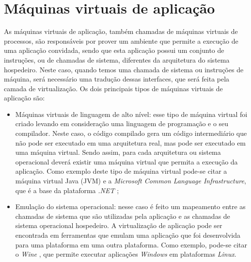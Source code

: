 \section{Máquinas virtuais de aplicação}
\label{section:virtaplicacao}

As máquinas virtuais de aplicação, também chamadas de máquinas virtuais de processos, são responsáveis por prover um ambiente que permite 
a execução de uma aplicação convidada, sendo que esta aplicação possui um conjunto de instruções, ou de chamadas de sistema, diferentes da 
arquitetura do sistema hospedeiro. Neste caso, quando temos uma chamada de sistema ou instruções de máquina, será necessário uma 
tradução dessas interfaces, que será feita pela camada de virtualização. Os dois principais tipos de máquinas virtuais de aplicação são:

\begin{itemize}
 \item Máquinas virtuais de linguagem de alto nível: esse tipo de máquina virtual foi criado levando em consideração uma linguagem de 
 programação e o seu compilador. Neste caso, o código compilado gera um código intermediário que não pode ser executado em uma arquitetura real, 
 mas pode ser executado em uma máquina virtual. Sendo assim, para cada arquitetura ou sistema operacional deverá existir uma máquina virtual que
 permita a execução da aplicação. Como exemplo deste tipo de máquina virtual pode-se citar a máquina virtual Java (\ac{JVM})
 e a \textit{Microsoft Common Language Infrastructure}, que é a base da plataforma \textit{.NET} \cite{carissimi2008};
 \item Emulação do sistema operacional: nesse caso é feito um mapeamento entre as chamadas de sistema que são utilizadas pela aplicação 
 e as chamadas de sistema operacional hospedeiro. A virtualização de aplicação pode ser encontrada em ferramentas que emulam uma aplicação que foi
 desenvolvida para uma plataforma em uma outra plataforma. Como exemplo, pode-se citar o \textit{Wine} \cite{wine}, que permite executar 
 aplicações \textit{Windows} em plataformas \textit{Linux}.
\end{itemize}


